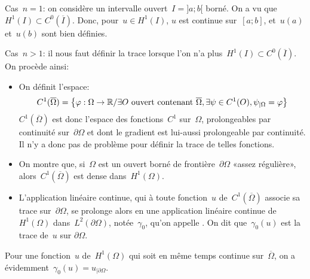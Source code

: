 \medskip
{}

\medskip
Cas~$n=1$:
on considère un intervalle ouvert~$I =]a;b[$ borné. On a vu que~$H^1(I)\subset C^0(\overline{I})$.
Donc, pour~$u\in H^1(I)$, $u$ est continue sur~$[a;b]$, et~$u(a)$ et~$u(b)$ sont bien définies.

\medskip
Cas~$n>1$:
il nous faut définir la trace lorsque l'on n'a plus~$H^1(I)\subset C^0(\overline{I})$. On procède ainsi:
\begin{itemize}
  \item On définit l'espace:
	\begin{equation}C^1(\overline{\Omega}) = \left\{\varphi:\Omega\rightarrow\mathbb R/ \exists O
	\text{ ouvert contenant } \overline{\Omega}, \exists \psi\in C^1(O), \psi_{|\Omega}=\varphi
	\right\}\end{equation}
	$C^1(\overline{\Omega})$ est donc l'espace des fonctions~$C^1$ sur~$\Omega$, prolongeables par continuité sur~$\partial\Omega$ et dont le gradient est lui-aussi prolongeable par continuité.
	Il n'y a donc pas de problème pour définir la trace de telles fonctions.
  \item On montre que, si~$\Omega$ est un ouvert borné de frontière~$\partial\Omega$  «assez régulière», alors~$C^1(\overline{\Omega})$ est dense dans~$H^1(\Omega)$.
  \item L'application linéaire continue, qui à toute fonction~$u$ de~$C^1(\overline{\Omega})$ associe sa trace sur~$\partial\Omega$, se prolonge alors en une application linéaire continue de~$H^1(\Omega)$ dans~$L^2(\partial\Omega)$, notée~$\gamma_0$, qu'on appelle . On dit que~$\gamma_0(u)$ est la trace de~$u$ sur $\partial\Omega$.
\end{itemize}
Pour une fonction~$u$ de~$H^1(\Omega)$ qui soit en même temps continue sur~$\overline{\Omega}$, on a évidemment~$\gamma_0(u) = u_{|\partial\Omega}$. 

